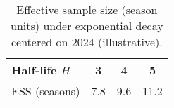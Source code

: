 \begin{table}[t]
  \centering
  \small
  \caption{Effective sample size (season units) under exponential decay centered on 2024 (illustrative).}
  \label{tab:ess}
  \begin{tabular}{lccc}
    \toprule
    Half-life $H$ & 3 & 4 & 5 \\
    \midrule
    ESS (seasons) & 7.8 & 9.6 & 11.2 \\
    \bottomrule
  \end{tabular}
\end{table}

